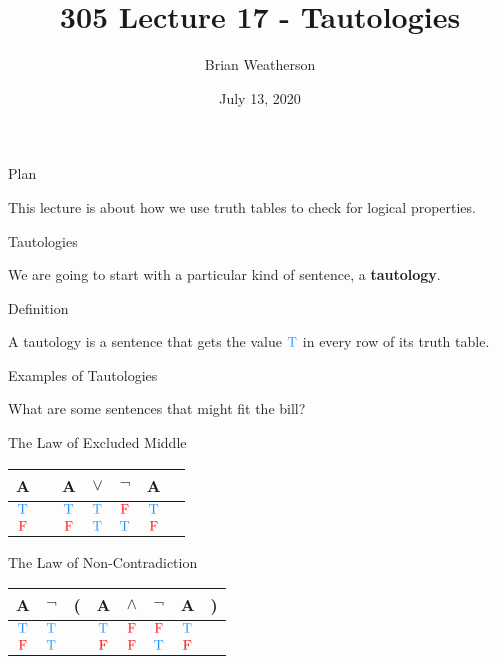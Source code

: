 \documentclass[
  ignorenonframetext,
]{beamer}
\title{305 Lecture 17 - Tautologies}
\author{Brian Weatherson}
\date{July 13, 2020}
\renewcommand{\,}{\text{, }}
\def\True{\textcolor{dodgerblue}{\text{T}}}
\def\False{\textcolor{red}{\text{F}}}
\begin{document}
\frame{\titlepage}

\begin{frame}{Plan}
\protect\hypertarget{plan}{}

This lecture is about how we use truth tables to check for logical
properties.

\end{frame}

\begin{frame}{Tautologies}
\protect\hypertarget{tautologies}{}

We are going to start with a particular kind of sentence, a
\textbf{tautology}.

\end{frame}

\begin{frame}{Definition}
\protect\hypertarget{definition}{}

A tautology is a sentence that gets the value \(\True\) in every row of
its truth table.

\end{frame}

\begin{frame}{Examples of Tautologies}
\protect\hypertarget{examples-of-tautologies}{}

What are some sentences that might fit the bill?

\end{frame}

\begin{frame}{The Law of Excluded Middle}
\protect\hypertarget{the-law-of-excluded-middle}{}

\begin{center}
\begin{tabular}{@{ }c | c@{ }@{ }c@{ }@{ }c@{ }@{ }c@{ }@{ }c@{ }@{ }c}
A &  & A & $\lor$ & $\neg$ & A & \\
\hline 
$\True$ &  & $\True$ & \textcolor{red}{$\True$} & $\False$ & $\True$ & \\
$\False$ &  & $\False$ & \textcolor{red}{$\True$} & $\True$ & $\False$ & \\
\end{tabular}
\end{center}

\end{frame}

\begin{frame}{The Law of Non-Contradiction}
\protect\hypertarget{the-law-of-non-contradiction}{}

\begin{center}
\begin{tabular}{@{ }c | c@{ }@{}c@{}@{ }c@{ }@{ }c@{ }@{ }c@{ }@{ }c@{ }@{}c@{ }}
A & $\neg$ & ( & A & $\wedge$ & $\neg$ & A & )\\
\hline 
$\True$ & \textcolor{red}{$\True$} &  & $\True$ & $\False$ & $\False$ & $\True$ & \\
$\False$ & \textcolor{red}{$\True$} &  & $\False$ & $\False$ & $\True$ & $\False$ & \\
\end{tabular}
\end{center}

\end{frame}
\end{document}
